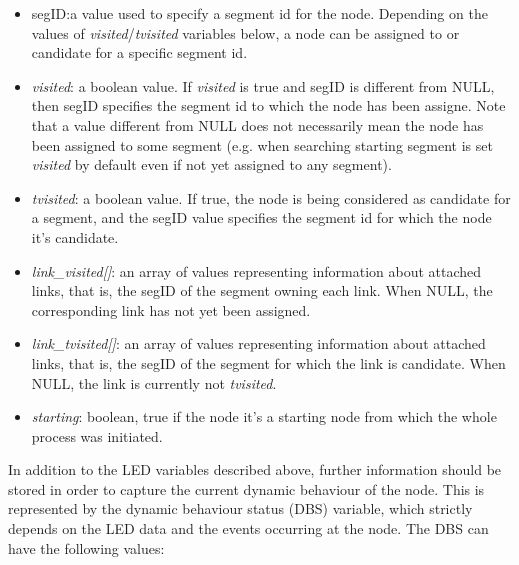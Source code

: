 \begin{itemize}
\item{segID}:a value used to specify a segment id for the node. Depending on
the values of \emph{visited}/\emph{tvisited} variables below, a node can be
assigned to or candidate for a specific segment id.  
\item{\emph{visited}}: a boolean value. If \emph{visited} is true
and segID is different from NULL, then segID specifies the segment id
to which the node has been assigne. Note that a value different from NULL does not
necessarily mean the node has been assigned to some segment (e.g. when
searching starting segment is set \emph{visited} by default even if not yet
assigned to any segment). 
\item{\emph{tvisited}}: a boolean value. If
true, the node is being considered as candidate for a segment, and the
segID value specifies the segment id for which the node it's candidate. 
\item{\emph{link\_visited[]}}: an array
of values representing information about attached links, that is, the
segID of the segment owning each link. When NULL, the corresponding link has not yet been
assigned.
\item{\emph{link\_tvisited[]}}: an array of
values representing information about attached links, that is, the segID of
the segment for which the link is candidate. When NULL, the link is
currently not \emph{tvisited}.  
\item{\emph{starting}}: boolean, true if the node it's a
starting node from which the whole process was initiated.
\end{itemize}

In addition to the LED variables described above, further information
should be stored in order to capture the current dynamic behaviour of
the node. This is represented by the dynamic behaviour status (DBS)
variable, which strictly depends on the LED data and the events
occurring at the node. The DBS can have the following values:

